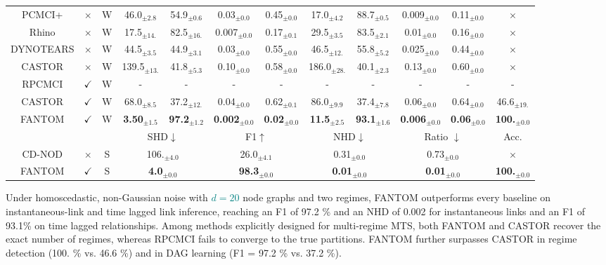 \begin{table}[H]
{\begin{tabular}{@{}ccc|cccccccc|c@{}}
PCMCI+ & $\times$ & W  & 46.0$_{\pm2.8}$  & 54.9$_{\pm0.6}$   & 0.03$_{\pm0.0}$  & 0.45$_{\pm0.0}$ & 17.0$_{\pm4.2}$  & 88.7$_{\pm0.5}$   & 0.009$_{\pm0.0}$& 0.11$_{\pm0.0}$ & $\times$ \\
    Rhino & $\times$ & W & 17.5$_{\pm14.}$ & 82.5$_{\pm16.}$  & 0.007$_{\pm0.0}$  & 0.17$_{\pm0.1}$ & 29.5$_{\pm3.5}$  & 83.5$_{\pm2.1}$   & 0.01$_{\pm0.0}$  & 0.16$_{\pm0.0}$ & $\times$ \\
    DYNOTEARS & $\times$ & W &  44.5$_{\pm3.5}$  & 44.9$_{\pm3.1}$   & 0.03$_{\pm0.0}$  & 0.55$_{\pm0.0}$ & 46.5$_{\pm12.}$ & 55.8$_{\pm5.2}$   & 0.025$_{\pm0.0}$  & 0.44$_{\pm0.0}$  & $\times$  \\
    CASTOR & $\times$ & W & 139.5$_{\pm13.}$ & 41.8$_{\pm5.3}$   & 0.10$_{\pm0.0}$  & 0.58$_{\pm0.0}$ & 186.0$_{\pm28.}$ & 40.1$_{\pm2.3}$   & 0.13$_{\pm0.0}$  & 0.60$_{\pm0.0}$ & $\times$  \\
    \midrule
    RPCMCI & $\checkmark$ & W & - & - & - & - & - & - & - & - & -  \\
    CASTOR & $\checkmark$ & W & 68.0$_{\pm8.5}$  & 37.2$_{\pm12.}$  & 0.04$_{\pm0.0}$  & 0.62$_{\pm0.1}$ & 86.0$_{\pm9.9}$  & 37.4$_{\pm7.8}$   & 0.06$_{\pm0.0}$  & 0.64$_{\pm0.0}$ & 46.6$_{\pm19.}$ \\
    \rowcolor{gray!20} FANTOM & $\checkmark$  & W & \textbf{3.50}$_{\pm1.5}$ & \textbf{97.2}$_{\pm1.2}$ & \textbf{0.002}$_{\pm0.0}$ & \textbf{0.02}$_{\pm0.0}$  & \textbf{11.5}$_{\pm2.5}$ & \textbf{93.1}$_{\pm1.6}$ & \textbf{0.006}$_{\pm0.0}$& \textbf{0.06}$_{\pm0.0}$& \textbf{100.}$_{\pm0.0}$  \\
    \midrule
      &   &  &\multicolumn{2}{c}{SHD$\downarrow$ } &\multicolumn{2}{c}{F1$\uparrow$} & \multicolumn{2}{c}{NHD$\downarrow$} & \multicolumn{2}{c|}{Ratio $\downarrow$ } & Acc.\\
    \midrule
    CD-NOD & $\times$ & S & \multicolumn{2}{c}{106.$_{\pm4.0}$} &\multicolumn{2}{c}{26.0$_{\pm4.1}$} & \multicolumn{2}{c}{0.31$_{\pm0.0}$} & \multicolumn{2}{c|}{0.73$_{\pm0.0}$} & $\times$ \\
    \rowcolor{gray!20} FANTOM & $\checkmark$ & S & \multicolumn{2}{c}{\textbf{4.0}$_{\pm0.0}$} &\multicolumn{2}{c}{\textbf{98.3}$_{\pm0.0}$} & \multicolumn{2}{c}{\textbf{0.01}$_{\pm0.0}$} & \multicolumn{2}{c|}{\textbf{0.01}$_{\pm0.0}$} & \textbf{100.}$_{\pm0.0}$  \\ \bottomrule
\end{tabular}}
\end{table}
Under homoscedastic, non-Gaussian noise with \textcolor{teal}{$d=20$} node graphs and two regimes, FANTOM outperforms every baseline on instantaneous-link and time lagged link inference, reaching an F1 of 97.2 \% and an NHD of 0.002 for instantaneous links and an F1 of 93.1\% on time lagged relationships. Among methods explicitly designed for multi-regime MTS, both FANTOM and CASTOR recover the exact number of regimes, whereas RPCMCI fails to converge to the true partitions. FANTOM further surpasses CASTOR in regime detection (100. \% vs. 46.6 \%) and in DAG learning (F1 = 97.2 \% vs. 37.2 \%).

